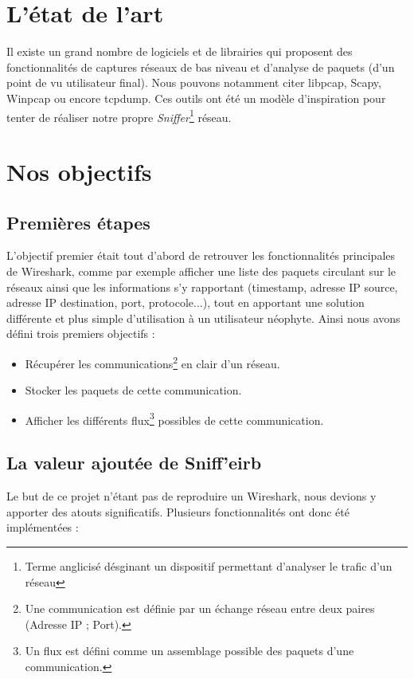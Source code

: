 \section{L'état de l'art}
Il existe un grand nombre de logiciels et de librairies qui proposent des fonctionnalités de captures réseaux de bas niveau et d'analyse de paquets (d'un point de vu utilisateur final). 
Nous pouvons notamment citer libpcap, Scapy, Winpcap ou encore tcpdump. Ces outils ont été un modèle d'inspiration pour tenter de réaliser notre propre \textit{Sniffer}\footnote{Terme anglicisé désginant un dispositif permettant d'analyser le trafic d'un réseau} réseau.\\

\section{Nos objectifs}
\subsection{Premières étapes}
L'objectif premier était tout d'abord de retrouver les fonctionnalités principales de Wireshark, comme par exemple afficher une liste des paquets circulant sur le réseaux ainsi que les informations s'y rapportant (timestamp, adresse IP source, adresse IP destination, port, protocole...), tout en apportant une solution différente et plus simple d'utilisation à un utilisateur néophyte. Ainsi nous avons défini trois premiers objectifs :
\begin{itemize}
\item Récupérer les communications\footnote{Une communication est définie par un échange réseau entre deux paires (Adresse IP ; Port).} en clair d'un réseau.
\item Stocker les paquets de cette communication.
\item Afficher les différents flux\footnote{Un flux est défini comme un assemblage possible des paquets d'une communication.} possibles de cette communication.\\
\end{itemize}

\subsection{La valeur ajoutée de Sniff'eirb}

Le but de ce projet n'étant pas de reproduire un Wireshark, nous devions y apporter des atouts significatifs. Plusieurs fonctionnalités ont donc été implémentées :

